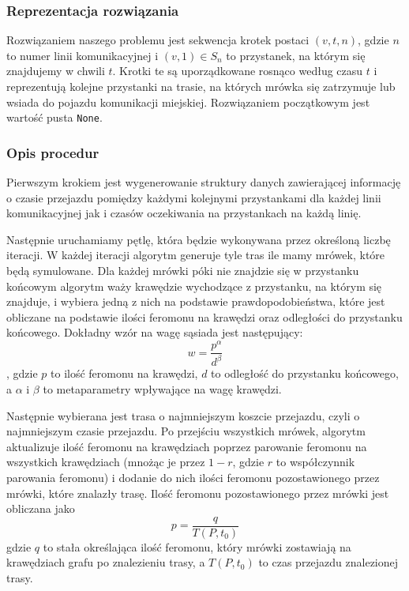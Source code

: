 \documentclass{article}
\begin{document}
\subsubsection{Reprezentacja rozwiązania}\label{subsec:solution_representation}
Rozwiązaniem naszego problemu jest sekwencja krotek postaci \((v, t, n)\), gdzie \(n\) to numer linii komunikacyjnej i
\((v, 1)\in S_n\) to przystanek, na którym się znajdujemy w chwili \(t\). Krotki te są uporządkowane rosnąco według czasu \(t\) i reprezentują
kolejne przystanki na trasie, na których mrówka się zatrzymuje lub wsiada do pojazdu komunikacji miejskiej.
Rozwiązaniem początkowym jest wartość pusta \texttt{None}.

\subsubsection{Opis procedur}
Pierwszym krokiem jest wygenerowanie struktury danych zawierającej informację o czasie przejazdu pomiędzy każdymi
kolejnymi przystankami dla każdej linii komunikacyjnej jak i czasów oczekiwania na przystankach na każdą linię.

Następnie uruchamiamy pętlę, która będzie wykonywana przez określoną liczbę iteracji. W każdej iteracji
algorytm generuje tyle tras ile mamy mrówek, które będą symulowane. Dla każdej mrówki póki nie znajdzie się w przystanku końcowym
algorytm waży krawędzie wychodzące z przystanku, na którym się znajduje, i wybiera jedną z nich
na podstawie prawdopodobieństwa, które jest obliczane na podstawie ilości feromonu na krawędzi oraz odległości do przystanku końcowego.
Dokładny wzór na wagę sąsiada jest następujący:
\[
    w = \frac{p^\alpha}{d^\beta}
\],
gdzie \(p\) to ilość feromonu na krawędzi, \(d\) to odległość do przystanku końcowego, a \(\alpha\) i \(\beta\) to metaparametry wpływające na wagę krawędzi.

Następnie wybierana jest trasa o najmniejszym koszcie przejazdu, czyli o najmniejszym czasie przejazdu.
Po przejściu wszystkich mrówek, algorytm aktualizuje ilość feromonu na krawędziach poprzez
parowanie feromonu na wszystkich krawędziach (mnożąc je przez \(1 - r\), gdzie \(r\) to współczynnik parowania feromonu)
i dodanie do nich ilości feromonu pozostawionego przez mrówki, które znalazły trasę. Ilość feromonu pozostawionego przez mrówki jest obliczana jako
\[
    p = \frac{q}{T(P, t_0)}
\]
gdzie \(q\) to stała określająca ilość feromonu, który mrówki zostawiają na krawędziach grafu po znalezieniu trasy, a \(T(P, t_0)\) to czas przejazdu znalezionej trasy.
\end{document}
